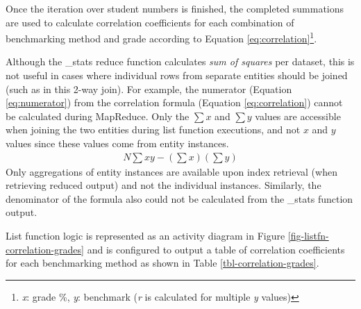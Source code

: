 Once the iteration over student numbers is finished, the completed summations are used to calculate correlation coefficients for each combination of benchmarking method and grade  according to Equation \ref{eq:correlation}\footnote{\textit{x}: grade \%, \textit{y}: benchmark (\textit{r} is calculated for multiple \textit{y} values)}.

Although the \_stats reduce function calculates \textit{sum of squares} per dataset, this is not useful in cases where individual rows from separate entities should be joined (such as in this 2-way join). For example, the numerator (Equation \ref{eq:numerator}) from the correlation formula (Equation \ref{eq:correlation}) cannot be calculated during MapReduce. Only the $\sum{x}$ and $\sum{y}$ values are accessible when joining the two entities during list function executions, and not $x$ and $y$ values since these values come from entity instances.
\begin{align}
    N\sum{xy} - (\sum{x})(\sum{y})\label{eq:numerator}
\end{align}
Only aggregations of entity instances are available upon index retrieval (when retrieving reduced output) and not the individual instances. Similarly, the denominator of the formula also could not be calculated from the \_stats function output.

List function logic is represented as an activity diagram in Figure \ref{fig-listfn-correlation-grades} and is configured to output a table of correlation coefficients for each benchmarking method as shown in Table \ref{tbl-correlation-grades}.

